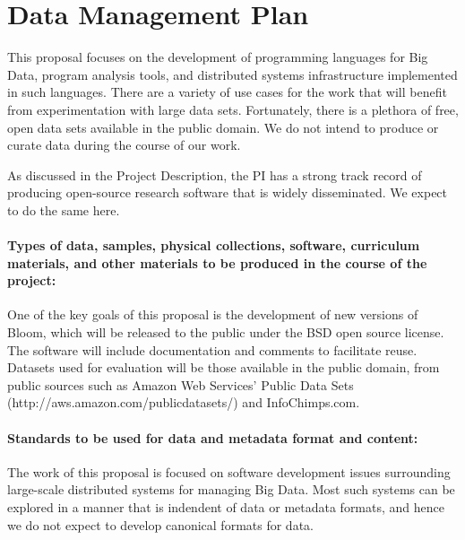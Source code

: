 \section*{Data Management Plan}


This proposal focuses on the development of programming languages for Big Data, program analysis tools, and distributed systems infrastructure implemented in such languages.  There are a variety of use cases for the work that will benefit from experimentation with large data sets.  Fortunately, there is a plethora of free, open data sets available in the public domain.  We do not intend to produce or curate data during the course of our work.

As discussed in the Project Description, the PI has a strong track record of producing open-source research software that is widely disseminated.  We expect to do the same here.


\paragraph{Types of data, samples, physical collections, software,
  curriculum materials, and other materials to be produced in the
  course of the project:}  One of the key goals of this proposal is the development of new versions of Bloom, which will be released to the public under the BSD open source license. The software will include documentation and comments to facilitate reuse. Datasets used for evaluation will be those available in the public domain, from public sources such as Amazon Web Services' Public Data Sets (http://aws.amazon.com/publicdatasets/) and InfoChimps.com.

\paragraph{Standards to be used for data and metadata format and
  content:}  The work of this proposal is focused on software development issues surrounding large-scale distributed systems for managing Big Data.  Most such systems can be explored in a manner that is indendent of data or metadata formats, and hence we do not expect to develop canonical formats for data.  

